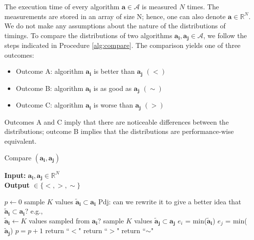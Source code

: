 \documentclass[conference]{IEEEtran}
\newcommand{\p}[1]{{\color{blue} Pdj: #1}}
\begin{document}
The execution time of every algorithm $\mathbf{a} \in \mathcal{A}$ is
measured $N$ times. The measurements are stored in an array of size N; hence, one can also denote
$\mathbf{a} \in \mathbb{R}^N$. We do not make any assumptions about the nature of the distributions of timings. To compare the
distributions of two algorithms $\mathbf{a_i},\mathbf{a_j} \in \mathcal{A}$, we follow the steps indicated in Procedure
\ref{alg:compare}.
%
The comparison yields one of three outcomes:
\begin{itemize}
\item Outcome A: algorithm $\mathbf{a_i}$ is better than $\mathbf{a_j}$ $(<)$
\item Outcome B: algorithm  $\mathbf{a_i}$ is as good as $\mathbf{a_j}$ $(\sim)$
\item Outcome C: algorithm  $\mathbf{a_i}$ is worse than $\mathbf{a_j}$ $(>)$
\end{itemize}
Outcomes A and C imply that there are noticeable differences between the distributions; outcome B implies that the
distributions are performance-wise equivalent. 
\begin{algorithm}
	\caption{Compare $(\mathbf{a_i}, \mathbf{a_j})$ }
	\label{alg:compare}
	\hspace*{\algorithmicindent} \textbf{Input: } $ \mathbf{a_i}, \mathbf{a_j} \in \mathbb{R}^{N}$ \\
	\hspace*{\algorithmicindent} \textbf{Output } $\in  \{<,>,\sim \}$
	\begin{algorithmic}[1] 
		\State $p \leftarrow 0$
		\State sample $K$ values $\mathbf{\tilde{a}_i} \subset \mathbf{a_i}$
                \p{can we rewrite it to give a better idea that $\mathbf{\tilde{a}_i} \subset \mathbf{a_i}$?  e.g., \\
                  $\mathbf{\tilde{a}_i} \leftarrow K$ values sampled from $\mathbf{a_i}$?}
		\State sample $K$ values $\mathbf{\tilde{a}_j} \subset \mathbf{a_j}$
		\State $e_i$ = min($\mathbf{\tilde{a}_i}$)
		\State $e_j$ = min($\mathbf{\tilde{a}_j}$)
		\State $p=p+1$
		\EndIf
		\EndFor
		\State return ``$<$"    
		\State return ``$>$" 
		\Else
		\State return ``$\sim$" 
		\EndIf
	\end{algorithmic}
      \end{algorithm}
\end{document}
